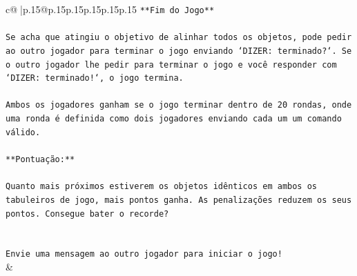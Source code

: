 \documentclass{article}
\begin{document}
{\begin{supertabular}{c@{$\;$}|p{.15\linewidth}@{}p{.15\linewidth}p{.15\linewidth}p{.15\linewidth}p{.15\linewidth}p{.15\linewidth}}
{{{\texttt{**Fim do Jogo**} \\
\\ 
\texttt{Se acha que atingiu o objetivo de alinhar todos os objetos, pode pedir ao outro jogador para terminar o jogo enviando `DIZER: terminado?`. Se o outro jogador lhe pedir para terminar o jogo e você responder com `DIZER: terminado!`, o jogo termina.} \\
\\ 
\texttt{Ambos os jogadores ganham se o jogo terminar dentro de 20 rondas, onde uma ronda é definida como dois jogadores enviando cada um um comando válido.} \\
\\ 
\texttt{**Pontuação:**} \\
\\ 
\texttt{Quanto mais próximos estiverem os objetos idênticos em ambos os tabuleiros de jogo, mais pontos ganha. As penalizações reduzem os seus pontos. Consegue bater o recorde?} \\
\\ 
\\ 
\texttt{Envie uma mensagem ao outro jogador para iniciar o jogo!} \\
            }
        }
    }
    & \\ \\


\end{supertabular}}
\end{document}
